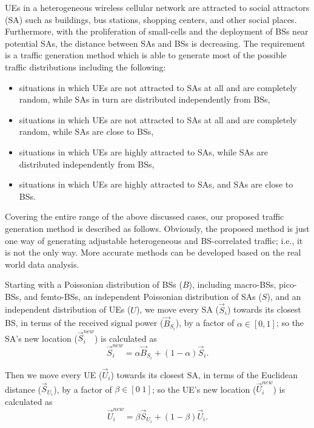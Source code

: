 \documentclass[journal]{IEEEtran}
\begin{document}
UEs in a heterogeneous wireless cellular network are attracted to social attractors (SA) such as buildings, bus stations, shopping centers, and other social places. Furthermore, with the proliferation of small-cells and the deployment of BSs near potential SAs, the distance between SAs and BSs is decreasing. The requirement is a traffic generation method which is able to generate most of the possible traffic distributions including the following:
\begin{itemize}
\item situations in which UEs are not attracted to SAs at all and are completely random, while SAs in turn are distributed independently from BSs,
\item situations in which UEs are not attracted to SAs at all and are completely random, while SAs are close to BSs,
\item situations in which UEs are highly attracted to SAs, while SAs are distributed independently from BSs,
\item situations in which UEs are highly attracted to SAs, and SAs are close to BSs.
\end{itemize}
Covering the entire range of the above discussed cases, our proposed traffic generation method is described as follows. Obviously, the proposed method is just one way of generating adjustable heterogeneous and BS-correlated traffic; i.e., it is not the only way. More accurate methods can be developed based on the real world data analysis.

Starting with a Poissonian distribution of BSs ($B$), including macro-BSs, pico-BSs, and femto-BSs, an independent Poissonian distribution of SAs ($S$), and an independent distribution of UEs ($U$), we move every SA ($\vec{S}_{i}$) towards its closest BS, in terms of the received signal power ($\vec{B}_{S_{i}}$), by a factor of $\alpha \in \left[0, 1\right]$; so the SA's new location ($\vec{S}^{new}_{i}$) is calculated as
\begin{equation}
\vec{S}^{new}_{i} = \alpha \vec{B}_{S_{i}} + (1-\alpha) \vec{S}_{i}.
\end{equation}

Then we move every UE ($\vec{U}_{i}$) towards its closest SA, in terms of the Euclidean distance ($\vec{S}_{U_{i}}$), by a factor of $\beta \in \left[0 \; 1\right ]$; so the UE's new location ($\vec{U}^{new}_{i}$) is calculated as
\begin{equation}
\vec{U}^{new}_{i} = \beta \vec{S}_{U_{i}} + (1-\beta) \vec{U}_{i}.
\end{equation}
\end{document}
